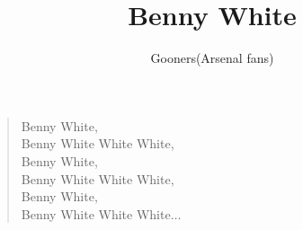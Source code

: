 \documentclass[a4paper,12pt]{article}
\title{Benny White}
\author{Gooners(Arsenal fans)}
\date{}
\begin{document}
	
	\maketitle
	
	\begin{verse}
		
		Benny White, \\
		Benny White White White, \\
		Benny White, \\
		Benny White White White, \\
		Benny White, \\
		Benny White White White$\ldots$
		
	\end{verse}
	
\end{document}
